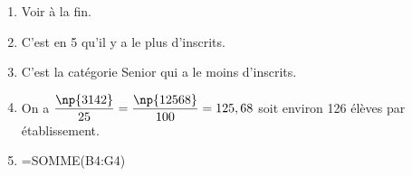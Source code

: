 
\bigskip
 
%
% 
%
 
\begin{enumerate}
\item %
Voir à la fin. 
\item %
C'est en 5 qu'il y a le plus d'inscrits. 
\item %
C'est la catégorie Senior qui a le moins d'inscrits. 
\item %
On a $\dfrac{\np{3142}}{25} = \dfrac{\np{12568}}{100} = 125,68$ soit environ 126 élèves par établissement. 
\item %

=SOMME(B4:G4)
\end{enumerate}

\bigskip 

